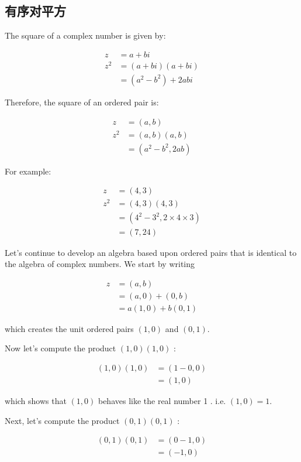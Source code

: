 \subsection{有序对平方}
The square of a complex number is given by:

$$
\begin{aligned}
z & =a+b i \\
z^{2} & =(a+b i)(a+b i) \\
& =\left(a^{2}-b^{2}\right)+2 a b i
\end{aligned}
$$

Therefore, the square of an ordered pair is:

$$
\begin{aligned}
z & =(a, b) \\
z^{2} & =(a, b)(a, b) \\
& =\left(a^{2}-b^{2}, 2 a b\right)
\end{aligned}
$$

For example:

$$
\begin{aligned}
z & =(4,3) \\
z^{2} & =(4,3)(4,3) \\
& =\left(4^{2}-3^{2}, 2 \times 4 \times 3\right) \\
& =(7,24)
\end{aligned}
$$

Let's continue to develop an algebra based upon ordered pairs that is identical to the algebra of complex numbers. We start by writing

$$
\begin{aligned}
z & =(a, b) \\
& =(a, 0)+(0, b) \\
& =a(1,0)+b(0,1)
\end{aligned}
$$

which creates the unit ordered pairs $(1,0)$ and $(0,1)$.

Now let's compute the product $(1,0)(1,0)$ :

$$
\begin{aligned}
(1,0)(1,0) & =(1-0,0) \\
& =(1,0)
\end{aligned}
$$

which shows that $(1,0)$ behaves like the real number 1 . i.e. $(1,0)=1$.

Next, let's compute the product $(0,1)(0,1)$ :

$$
\begin{aligned}
(0,1)(0,1) & =(0-1,0) \\
& =(-1,0)
\end{aligned}
$$

